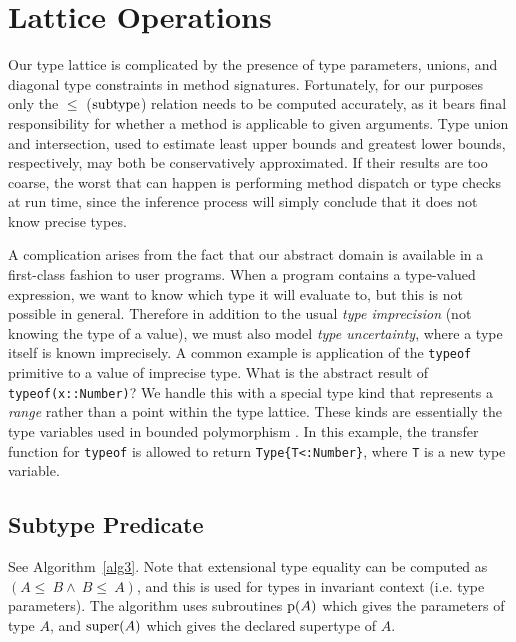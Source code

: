 

\section{Lattice Operations}

Our type lattice is complicated by the presence of type parameters, unions,
and diagonal type constraints in method signatures. Fortunately, for our
purposes only the $\leq$ ($\operatorname{subtype}$) relation needs to be computed accurately,
as it bears final responsibility for whether a method is applicable to
given arguments. Type union and intersection, used to estimate
least upper bounds and greatest lower bounds, respectively, may both be
conservatively approximated. If their results are too coarse, the
worst that can happen is performing method dispatch or type checks
at run time, since the inference process will simply conclude that it does
not know precise types.

A complication arises from the fact that our abstract domain is
available in a first-class fashion to user programs. When a program
contains a type-valued expression, we want to know which type it will
evaluate to, but this is not possible in general. Therefore in addition
to the usual \emph{type imprecision} (not knowing the type of a value),
we must also model \emph{type uncertainty}, where a type itself is
known imprecisely. A common example is application of the {\tt typeof}
primitive to a value of imprecise type. What is the abstract result of
{\tt typeof(x::Number)}? We handle this with a special type kind that
represents a \emph{range} rather than a point within the type lattice.
These kinds are essentially the type variables used in bounded
polymorphism \cite{boundedquant}. In this example, the
transfer function for {\tt typeof} is allowed to return
{\tt Type\{T<:Number\}}, where {\tt T} is a new type variable.


\subsection{Subtype Predicate}

See Algorithm~\ref{alg3}. Note that extensional type equality can be
computed as $(A\leq~B\land~B\leq~A)$, and this is used for types in
invariant context (i.e. type parameters). The algorithm uses subroutines
$\operatorname{p}(A)$ which gives the parameters of type $A$, and $\operatorname{super}(A)$ which gives
the declared supertype of $A$.

